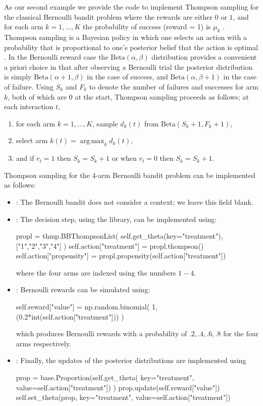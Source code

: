 \documentclass[nojss]{jss}
\DeclareMathOperator*{\argmax}{arg\,max}
\begin{document}
As our second example we provide the code to implement Thompson sampling for the classical Bernoulli bandit problem where the rewards are either $0$ or $1$, and for each arm $k=1, \dots, K$ the probability of success (reward = 1) is $\mu_k$ \citep{Kaufmann2012}. Thompson sampling is a Bayesian policy in which one selects an action with a probability that is  proportional to one's posterior belief that the action is optimal \citep[see][for details]{Kaufmann2012}. In the Bernoulli reward case the $\text{Beta}(\alpha,\beta)$ distribution provides a convenient a priori choice in that after observing a Bernoulli trial the posterior distribution is simply $\text{Beta}(\alpha+1,\beta)$ in the case of success, and $\text{Beta}(\alpha,\beta+1)$ in the case of failure. Using $S_k$ and $F_k$ to denote the number of failures and successes for arm $k$, both of which are $0$ at the start, Thompson sampling proceeds as follows; at each interaction $t$,
\begin{enumerate}
\item for each arm $k=1, \dots, K$, sample $d_k(t)$ from $\text{Beta}(S_k+1,F_k+1)$,
\item select arm $k(t) = \argmax_{k} d_k(t)$,
\item and if $r_t = 1$ then $S_k = S_k+1$ or when $r_t = 0$ then $S_k = S_k+1$.
\end{enumerate}

Thompson sampling for the $4$-arm Bernoulli bandit problem can be implemented as follows:
\begin{itemize}
\item {}: The Bernoulli bandit does not consider a context; we leave this field blank.
\item {}: The decision step, using the  library, can be implemented using:
\begin{Code}
propl = thmp.BBThompsonList(
     self.get_theta(key="treatment"), ["1","2","3","4"]
     )
self.action["treatment"] = propl.thompson()
self.action["propensity"] = propl.propensity(self.action["treatment"])
\end{Code}
where the four arms are indexed using the numbers $1-4$.

\item {}: Bernoulli rewards can be simulated using:
\begin{Code}
self.reward["value"] = np.random.binomial(
     1,(0.2*int(self.action["treatment"]))
     )
\end{Code}
which produces Bernoulli rewards with a probability of $.2,.4,.6,.8$ for the four arms respectively.

\item {}: Finally, the updates of the posterior distributions are implemented using
\begin{Code}
prop = base.Proportion(self.get_theta(
     key="treatment", value=self.action["treatment"])
     )
prop.update(self.reward["value"])
self.set_theta(prop, key="treatment", value=self.action["treatment"])
\end{Code}

\end{itemize}
\end{document}
